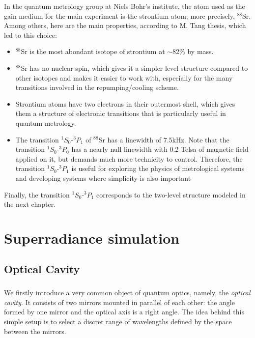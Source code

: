 \documentclass[10pt]{report}
\begin{document}
In the quantum metrology group at Niels Bohr's institute, the atom used as the gain medium for the main experiment is the strontium atom; more precisely, $^{88}$Sr. Among others, here are the main properties, according to M. Tang thesis, which led to this choice:
\begin{itemize}
	\item $^{88}$Sr is the most abondant isotope of strontium at $\sim$82\% by mass.
	\item $^{88}$Sr has no nuclear spin, which gives it a simpler level structure
compared to other isotopes and makes it easier to work with, especially for the many transitions involved in the repumping/cooling scheme.
	\item Strontium atoms have two electrons in their outermost shell, which gives them a structure of electronic transitions that is particularly useful in quantum metrology.
	\item The transition  $^1S_0$-$^3P_1$ of $^{88}$Sr has a linewidth of 7.5kHz. Note that the transition $^1S_0$-$^3P_0$ has a nearly null linewidth with 0.2 Telsa of magnetic field applied on it, but demands much more technicity to control. Therefore, the transition $^1S_0$-$^3P_1$ is useful for exploring the physics of metrological systems and developing systems where simplicity is also important
\end{itemize}

Finally, the transition $^1S_0$-$^3P_1$ corresponds to the two-level structure modeled in the next chapter.



\chapter{Superradiance simulation}
\section{Optical Cavity}
\paragraph{}
We firstly introduce a very common object of quantum optics, namely, the \textit{optical cavity}. It consists of two mirrors mounted in parallel of each other: the angle formed by one mirror and the optical axis is a right angle. The idea behind this simple setup is to select a discret range of wavelengths defined by the space between the mirrors. 
\end{document}
